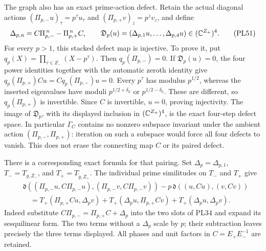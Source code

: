 The graph also has an exact prime-action defect. Retain the actual
diagonal actions \((\Pi_{p,-}u)_\tau=p^\tau u_\tau\) and
\((\Pi_{p,+}v)_z=p^zv_z\), and define
\[
 \Delta_{p,n}=C\Pi_{p,-}^{\,n}-\Pi_{p,+}^{\,n}C,\qquad
 \mathfrak D_p(u)=(\Delta_{p,1}u,\ldots,\Delta_{p,4}u)
          \in(\mathbb C^{Z_+})^4 .
 \tag{PL51}\label{pl:pl:prime-graph-defect}
\]
For every \(p>1\), this stacked defect map is injective.
To prove it, put \(q_p(X)=\prod_{\tau\in Z_-}(X-p^\tau)\).
Then \(q_p(\Pi_{p,-})=0\). If \(\mathfrak D_p(u)=0\),
the four power identities together with the automatic zeroth
identity give
\(q_p(\Pi_{p,+})Cu=Cq_p(\Pi_{p,-})u=0\).
Every \(p^\tau\) has modulus \(p^{1/2}\), whereas the inserted
eigenvalues have moduli \(p^{1/2+\delta_0}\) or
\(p^{1/2-\delta_0}\). These are different, so
\(q_p(\Pi_{p,+})\) is invertible. Since \(C\) is invertible,
\(u=0\), proving injectivity.
The image of \(\mathfrak D_p\), with its displayed inclusion
in \((\mathbb C^{Z_+})^4\), is the exact four-step defect space.
In particular \(\Gamma_C\) contains no nonzero subspace invariant
under the ambient action \((\Pi_{p,-},\Pi_{p,+})\): iteration on
such a subspace would force all four defects to vanish.
This does not erase the connecting map \(C\) or its paired defect.

There is a corresponding exact formula for that pairing.
Set \(\Delta_p=\Delta_{p,1}\), \(T_-=T_{g,Z_-}\), and
\(T_+=T_{\widetilde g,Z_+}\). The individual prime similitudes
on \(T_-\) and \(T_+\) give
\[
 \begin{aligned}
 &\mathfrak d((\Pi_{p,-}u,C\Pi_{p,-}u),
             (\Pi_{p,-}v,C\Pi_{p,-}v))
              -p\,\mathfrak d((u,Cu),(v,Cv))\\
 &\quad=T_+(\Pi_{p,+}Cu,\Delta_pv)
        +T_+(\Delta_pu,\Pi_{p,+}Cv)
        +T_+(\Delta_pu,\Delta_pv).
 \end{aligned}
 \tag{PL52}\label{pl:pl:paired-prime-defect}
\]
Indeed substitute \(C\Pi_{p,-}=\Pi_{p,+}C+\Delta_p\) into
the two slots of PL34 and expand its sesquilinear form.
The two terms without a \(\Delta_p\) scale by \(p\); their
subtraction leaves precisely the three terms displayed.
All phases and unit factors in \(C=E_+E_-^{-1}\) are retained.

